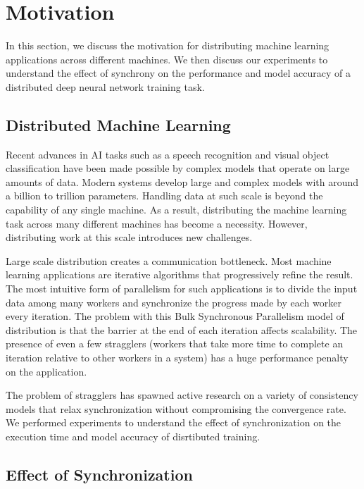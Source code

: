\section{Motivation} \label{sec:motivation}

In this section, we discuss the motivation for distributing
machine learning applications across different machines.
We then discuss our experiments to understand the effect of
synchrony on the performance and model accuracy of a distributed
deep neural network training task.

\subsection{Distributed Machine Learning}

Recent advances in AI tasks such as a speech recognition and visual 
object classification have been made possible by complex models
that operate on large amounts of data. Modern systems \cite{distbelief}
\cite{projectadam}\cite{parameterserver} develop large and complex
models with around a billion to trillion parameters. Handling data
at such scale is beyond the capability of any single machine. As a 
result, distributing the machine learning task across many different
machines has become a necessity. However, distributing work at 
this scale introduces new challenges.

Large scale distribution creates a communication bottleneck. Most 
machine learning applications are iterative algorithms that progressively
refine the result. The most intuitive form of parallelism for such 
applications is to divide the input data among many workers and 
synchronize the progress made by each worker every iteration. The 
problem with this Bulk Synchronous Parallelism model of distribution 
is that the barrier at the end of each iteration affects scalability.
The presence of even a few stragglers (workers that take more time
to complete an iteration relative to other workers in a system) 
has a huge performance penalty on the application.

The problem of stragglers has spawned active research on a variety
of consistency models that relax synchronization without compromising
the convergence rate\cite{communicationthesis}\cite{gangerstraggler}.
We performed experiments to understand the effect of synchronization 
on the execution time and model accuracy of disrtibuted training.

\subsection{Effect of Synchronization}

